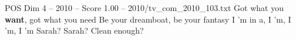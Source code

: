 \begin{textsample}{POS Dim 4 – 2010 – Score 1.00 – 2010/tv\_com\_2010\_103.txt}  \label{ex:f4_pos_060}
Got what you \textbf{want}, got what you need Be your dreamboat, be your fantasy I 'm in a, I 'm, I 'm, I 'm Sarah?
Sarah?
Clean enough?

\end{textsample}
